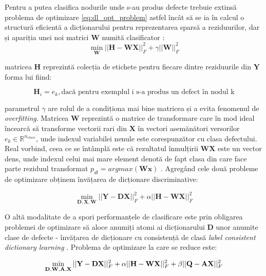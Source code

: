 Pentru a putea clasifica nodurile unde s-au produs defecte trebuie extinsă problema de optimizare \eqref{eq:dl_opt_problem} astfel încât să se ia în calcul o structură eficientă a dicționarului pentru reprezentarea sparsă a reziduurilor, dar și apariția unei noi matrici $\mathbf{W}$ numită clasificator \cite{DL_book}:
\begin{equation}
    \min_{\mathbf{W}} || \mathbf{H} - \mathbf{W}\mathbf{X}||_F^{2} + \gamma ||\mathbf{W}||^2_F
    \label{eq:dl_nmf}
\end{equation}

matricea $\mathbf{H}$ reprezintă colecția de etichete pentru fiecare dintre reziduurile din $\mathbf{Y}$
forma lui fiind:

\begin{equation}
    \mathbf{H}_i = e_k, \text{dacă pentru exemplul i s-a produs un defect în nodul k}
    \label{eq:struct_H}
\end{equation}

parametrul $\gamma$ are rolul de a condiționa mai bine matricea și a evita fenomenul de \textit{overfitting}.
Matricea $\mathbf{W}$ reprezintă o matrice de transformare care în mod ideal încearcă să transforme vectorii rari din $\mathbf{X}$ în vectori asemănători versorilor $e_k \in \mathbb{R}^{n_{clase}}$, unde indexul variabilei nenule este corespunzător cu clasa defectului. Real vorbind, ceea ce se întâmplă este că rezultatul înmulțirii $\mathbf{W}\mathbf{X}$ este un vector dens, unde indexul celui mai mare element denotă de fapt clasa din care face parte reziduul transformat $p_{dl} = argmax(\mathbf{W}\mathbf{x})$ \cite[Capitolul 8]{DL_book}. 
Agregând cele două probleme de optimizare obținem învățarea de dicționare discriminative:

\begin{equation}
    \min_{\mathbf{D}, \mathbf{X}, \mathbf{W}} || \mathbf{Y} - \mathbf{D} \mathbf{X} ||^2_F + \alpha || \mathbf{H} - \mathbf{W} \mathbf{X} ||^2_F
    \label{eq:disc_DL}
\end{equation}


O altă modalitate de a spori performanțele de clasificare este prin obligarea problemei de optimizare să aloce anumiți atomi ai dicționarului $\mathbf{D}$ unor anumite clase de defecte - învățarea de dicționare cu consistență de clasă \textit{label consistent dictionary learning} \cite{DL_book}. Problema de optimizare la care se reduce este:

\begin{equation}
    \min_{\mathbf{D}, \mathbf{W}, \mathbf{A}, \mathbf{X}} || \mathbf{Y} - \mathbf{D}\mathbf{X}||^2_F + \alpha ||\mathbf{H} - \mathbf{W} \mathbf{X} ||^2_F + \beta ||\mathbf{Q} - \mathbf{A}\mathbf{X} ||^2_F
    \label{eq:lc_dl}
\end{equation}


